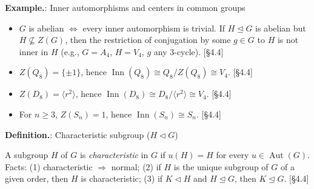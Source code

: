 \documentclass[12pt]{article}
\theoremstyle{definition}
\newcommand{\Aut}{\operatorname{Aut}}
\newcommand{\Inn}{\operatorname{Inn}}
\begin{document}

\newpage


\noindent\textbf{Example.}: Inner automorphisms and centers in common groups

\newpage

\begin{itemize}
  \item $G$ is abelian $\iff$ every inner automorphism is trivial. If $H\trianglelefteq G$ is abelian but $H\nsubseteq Z(G)$, then the restriction of conjugation by some $g\in G$ to $H$ is not inner in $H$ (e.g., $G=A_4$, $H=V_4$, $g$ any $3$-cycle). \hfill {\footnotesize [§4.4]}
  \item $Z(Q_8)=\{\pm1\}$, hence $\Inn(Q_8)\cong Q_8/Z(Q_8)\cong V_4$. \hfill {\footnotesize [§4.4]}
  \item $Z(D_8)=\langle r^2\rangle$, hence $\Inn(D_8)\cong D_8/\langle r^2\rangle\cong V_4$. \hfill {\footnotesize [§4.4]}
  \item For $n\ge3$, $Z(S_n)=1$, hence $\Inn(S_n)\cong S_n$. \hfill {\footnotesize [§4.4]}
\end{itemize}


\newpage


\noindent\textbf{Definition.}: Characteristic subgroup ($H\triangleleft G$)

\newpage

A subgroup $H$ of $G$ is \emph{characteristic} in $G$ if $u(H)=H$ for every $u\in\Aut(G)$. Facts: (1) characteristic $\Rightarrow$ normal; (2) if $H$ is the unique subgroup of $G$ of a given order, then $H$ is characteristic; (3) if $K\triangleleft H$ and $H\trianglelefteq G$, then $K\trianglelefteq G$. \hfill {\footnotesize [§4.4]}\\

\end{document}
